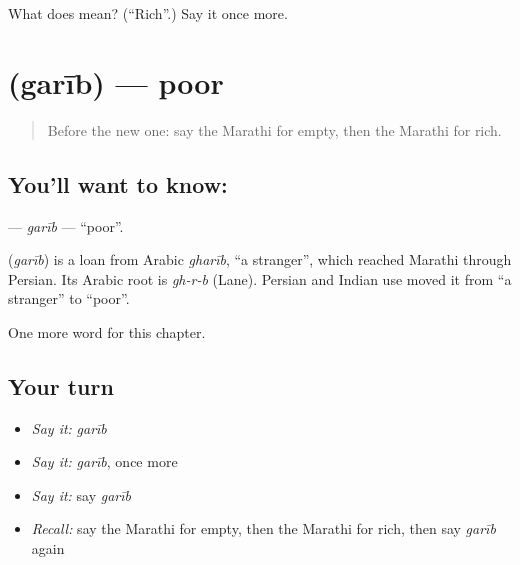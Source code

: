 \begin{tcolorbox}[breakable,colback=teal!4,colframe=teal!35!black,title={Before you move on}]
What does  mean? (\textquotedblleft{}Rich\textquotedblright{}.) Say it once more.
\end{tcolorbox}
\section[\texorpdfstring{\mr{गरीब} (garīb)}{गरीब (garīb)}]{ (garīb) — poor}

\label{lesson:MR-C105-garib}



\begin{quote}
Before the new one: say the Marathi for empty, then the Marathi for rich.
\end{quote}

\subsection*{You'll want to know: }
\textbf{} — \emph{garīb} — \textquotedblleft{}poor\textquotedblright{}.

\begin{cousinweb}
\textbf{} (\emph{garīb}) is a loan from Arabic \emph{gharīb}, \textquotedblleft{}a stranger\textquotedblright{}, which reached Marathi through Persian. Its Arabic root is \emph{gh-r-b} (Lane). Persian and Indian use moved it from \textquotedblleft{}a stranger\textquotedblright{} to \textquotedblleft{}poor\textquotedblright{}.
\end{cousinweb}

\begin{grammarlens}[title={What you've built}]
One more word for this chapter.
\end{grammarlens}

\subsection*{Your turn}
\begin{itemize}
\raggedright
  \item \emph{Say it:} \emph{garīb}
  \item \emph{Say it:} \emph{garīb}, once more
  \item \emph{Say it:} say \emph{garīb}
  \item \emph{Recall:} say the Marathi for empty, then the Marathi for rich, then say \emph{garīb} again
\end{itemize}

